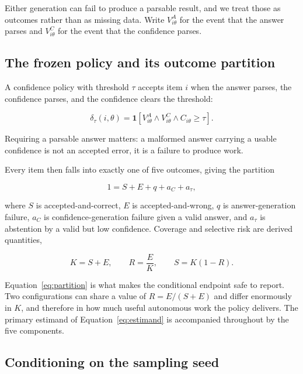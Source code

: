 \documentclass[information,article,submit,moreauthors]{Definitions/mdpi}
\begin{document}
Either generation can fail to produce a parsable result, and we treat those as
outcomes rather than as missing data. Write $V^A_{i\theta}$ for the event that
the answer parses and $V^C_{i\theta}$ for the event that the confidence parses.

\subsection{The frozen policy and its outcome partition}

A confidence policy with threshold $\tau$ accepts item $i$ when the answer
parses, the confidence parses, and the confidence clears the threshold:

\begin{equation}
\delta_\tau(i,\theta) = \mathbf{1}\!\left[V^A_{i\theta} \wedge V^C_{i\theta}
\wedge C_{i\theta} \ge \tau\right].
\label{eq:policy}
\end{equation}

\noindent
Requiring a parsable answer matters: a malformed answer carrying a usable
confidence is not an accepted error, it is a failure to produce work.

Every item then falls into exactly one of five outcomes, giving the partition

\begin{equation}
1 = S + E + q + a_C + a_\tau,
\label{eq:partition}
\end{equation}

\noindent
where $S$ is accepted-and-correct, $E$ is accepted-and-wrong, $q$ is
answer-generation failure, $a_C$ is confidence-generation failure given a valid
answer, and $a_\tau$ is abstention by a valid but low confidence. Coverage and
selective risk are derived quantities,

\begin{equation}
K = S + E, \qquad R = \frac{E}{K}, \qquad S = K(1-R).
\label{eq:derived}
\end{equation}

\noindent
Equation~\eqref{eq:partition} is what makes the conditional endpoint safe to
report. Two configurations can share a value of $R = E/(S+E)$ and differ
enormously in $K$, and therefore in how much useful autonomous work the policy
delivers. The primary estimand of Equation~\eqref{eq:estimand} is accompanied
throughout by the five components.

\subsection{Conditioning on the sampling seed}
\end{document}
